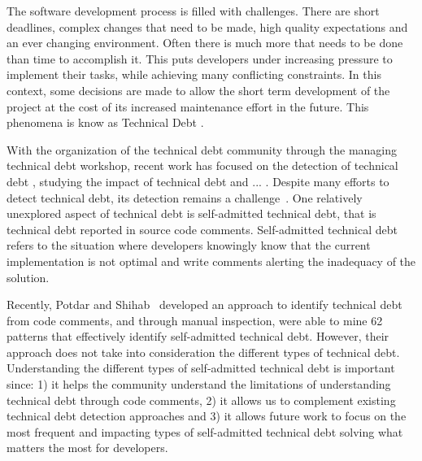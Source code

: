 The software development process is filled with challenges. There are short deadlines, complex changes that need to be made, high quality expectations and an ever changing environment. Often there is much more that needs to be done than time to accomplish it. This puts developers under increasing pressure to implement their tasks, while achieving many conflicting constraints. In this context, some decisions are made to allow the short term development of the project at the cost of its increased maintenance effort in the future. This phenomena is know as Technical Debt \cite{Cunningham1992}. 


With the organization of the technical debt community through the managing technical debt workshop, recent work has focused on the detection of technical debt , studying the impact of technical debt  and ... . Despite many efforts to detect technical debt, its detection remains a challenge~\cite{Potdar2014ICSME}. One relatively unexplored aspect of technical debt is self-admitted technical debt, that is technical debt reported in source code comments. Self-admitted technical debt refers to the situation where developers knowingly know that the current implementation is not optimal and write comments alerting the inadequacy of the solution. 

Recently, Potdar and Shihab~\cite{Potdar2014ICSME} developed an approach to identify technical debt from code comments, and through manual inspection, were able to mine 62 patterns that effectively identify self-admitted technical debt. However, their approach does not take into consideration the different types of technical debt. Understanding the different types of self-admitted technical debt is important since: 1) it helps the community understand the limitations of understanding technical debt through code comments, 2) it allows us to complement existing technical debt detection approaches and 3) it allows future work to focus on the most frequent and impacting types of self-admitted technical debt solving what matters the most for developers. 

